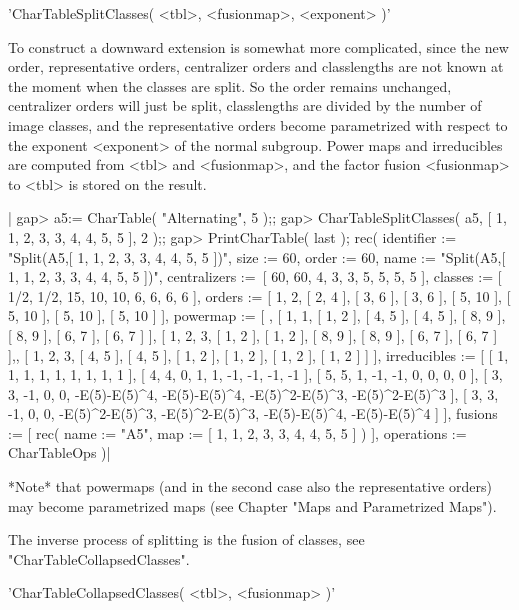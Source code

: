 \vspace{5mm}
'CharTableSplitClasses( <tbl>, <fusionmap>, <exponent> )'

To construct a downward extension is somewhat more complicated, since the
new order, representative orders, centralizer orders and classlengths are
not known at the moment when the classes are split.
So the order remains unchanged, centralizer orders will just be split,
classlengths are divided by the number of image classes, and the
representative orders become parametrized with respect to the exponent
<exponent> of the normal subgroup.
Power maps and irreducibles are computed from <tbl> and <fusionmap>,
and the factor fusion <fusionmap> to <tbl> is stored on the result.

|    gap> a5:= CharTable( "Alternating", 5 );;
    gap> CharTableSplitClasses( a5, [ 1, 1, 2, 3, 3, 4, 4, 5, 5 ], 2 );;
    gap> PrintCharTable( last );
    rec( identifier := "Split(A5,[ 1, 1, 2, 3, 3, 4, 4, 5, 5 ])", size :=
    60, order :=
    60, name := "Split(A5,[ 1, 1, 2, 3, 3, 4, 4, 5, 5 ])", centralizers :=\
     [ 60, 60, 4, 3, 3, 5, 5, 5, 5 ], classes :=
    [ 1/2, 1/2, 15, 10, 10, 6, 6, 6, 6 ], orders :=
    [ 1, 2, [ 2, 4 ], [ 3, 6 ], [ 3, 6 ], [ 5, 10 ], [ 5, 10 ],
      [ 5, 10 ], [ 5, 10 ] ], powermap :=
    [ , [ 1, 1, [ 1, 2 ], [ 4, 5 ], [ 4, 5 ], [ 8, 9 ], [ 8, 9 ],
          [ 6, 7 ], [ 6, 7 ] ],
      [ 1, 2, 3, [ 1, 2 ], [ 1, 2 ], [ 8, 9 ], [ 8, 9 ], [ 6, 7 ],
          [ 6, 7 ] ],,
      [ 1, 2, 3, [ 4, 5 ], [ 4, 5 ], [ 1, 2 ], [ 1, 2 ], [ 1, 2 ],
          [ 1, 2 ] ] ], irreducibles := [ [ 1, 1, 1, 1, 1, 1, 1, 1, 1 ],
      [ 4, 4, 0, 1, 1, -1, -1, -1, -1 ], [ 5, 5, 1, -1, -1, 0, 0, 0, 0 ],
      [ 3, 3, -1, 0, 0, -E(5)-E(5)^4, -E(5)-E(5)^4, -E(5)^2-E(5)^3,
          -E(5)^2-E(5)^3 ],
      [ 3, 3, -1, 0, 0, -E(5)^2-E(5)^3, -E(5)^2-E(5)^3, -E(5)-E(5)^4,
          -E(5)-E(5)^4 ] ], fusions := [ rec(
          name := "A5",
          map := [ 1, 1, 2, 3, 3, 4, 4, 5, 5 ] )
     ], operations := CharTableOps )|

*Note* that powermaps (and in the second case also the representative
orders) may become parametrized maps
(see Chapter "Maps and Parametrized Maps").

The inverse process of splitting is the fusion of classes, see
"CharTableCollapsedClasses".

\Section{CharTableCollapsedClasses}%

'CharTableCollapsedClasses( <tbl>, <fusionmap> )'

